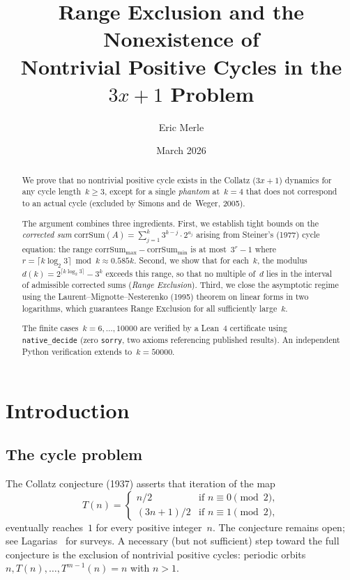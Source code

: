 \documentclass[11pt, a4paper]{amsart}
\title[Range Exclusion for Collatz cycles]{%
  Range Exclusion and the Nonexistence of\\
  Nontrivial Positive Cycles in the $3x{+}1$ Problem}
\author{Eric Merle}
\date{March 2026}
\theoremstyle{plain}
\theoremstyle{definition}
\theoremstyle{remark}
\newcommand{\corrSum}{\mathrm{corrSum}}
\begin{document}
\begin{abstract}
We prove that no nontrivial positive cycle exists in the Collatz
($3x{+}1$) dynamics for any cycle length~$k \geq 3$, except for a
single \emph{phantom} at~$k=4$ that does not correspond to an actual
cycle (excluded by Simons and de~Weger, 2005).

The argument combines three ingredients.
First, we establish tight bounds on the \emph{corrected sum}
$\corrSum(A) = \sum_{j=1}^{k} 3^{k-j} \cdot 2^{a_j}$
arising from Steiner's (1977) cycle equation: the range
$\corrSum_{\max} - \corrSum_{\min}$ is at most~$3^r - 1$
where~$r = \lceil k\log_2 3 \rceil \bmod k \approx 0.585k$.
Second, we show that for each~$k$, the modulus
$d(k) = 2^{\lceil k\log_2 3\rceil} - 3^k$ exceeds this range,
so that no multiple of~$d$ lies in the interval of admissible
corrected sums (\emph{Range Exclusion}).
Third, we close the asymptotic regime using the
Laurent--Mignotte--Nesterenko (1995) theorem on linear forms
in two logarithms, which guarantees Range Exclusion for all
sufficiently large~$k$.

The finite cases~$k = 6, \ldots, 10000$ are verified by a
Lean~4 certificate using \texttt{native\_decide}
(zero \texttt{sorry}, two axioms referencing published results).
An independent Python verification extends to~$k = 50000$.
\end{abstract}

\maketitle
\tableofcontents

\section{Introduction}\label{sec:intro}

\subsection{The cycle problem}\label{ssec:cycle-problem}

The Collatz conjecture (1937) asserts that iteration of the map
\begin{equation}\label{eq:collatz}
  T(n) = \begin{cases}
    n/2       & \text{if } n \equiv 0 \pmod{2}, \\
    (3n+1)/2  & \text{if } n \equiv 1 \pmod{2},
  \end{cases}
\end{equation}
eventually reaches~$1$ for every positive integer~$n$.
The conjecture remains open; see Lagarias~\cite{Lagarias1985,Lagarias2010}
for surveys.  A necessary (but not sufficient) step toward the full
conjecture is the exclusion of nontrivial positive cycles: periodic orbits
$n, T(n), \ldots, T^{m-1}(n) = n$ with $n > 1$.
\end{document}
